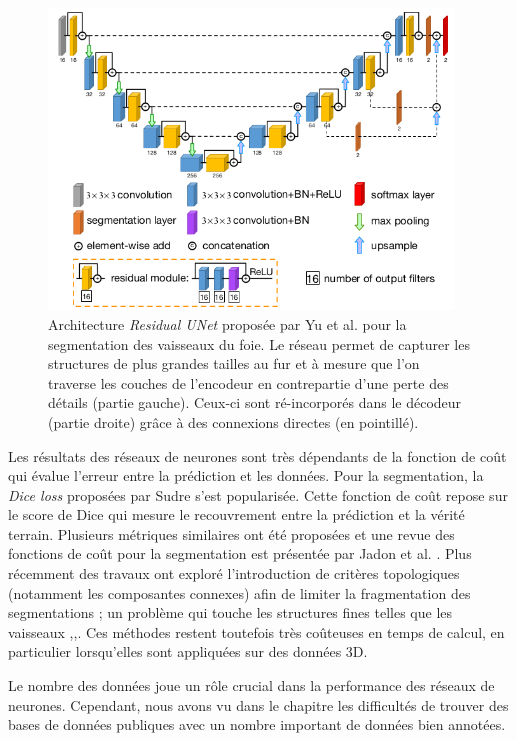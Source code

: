       \begin{figure}[!ht]
        \centering
        \includegraphics[height=8cm]{Images/Residual_Unet_Yu.png}
        \caption{Architecture \textit{Residual UNet} proposée par Yu et al. \cite{yu2019_liver_ResUnet} pour la segmentation des vaisseaux du foie. Le réseau permet de capturer les structures de plus grandes tailles au fur et à mesure que l'on traverse les couches de l'encodeur en contrepartie d'une perte des détails (partie gauche). Ceux-ci sont ré-incorporés dans le décodeur (partie droite) grâce à des connexions directes (en pointillé). }
        \label{fig:yu_resunet}
      \end{figure}
      
      Les résultats des réseaux de neurones sont très dépendants de la fonction de coût qui évalue l'erreur entre la prédiction et les données. Pour la segmentation, la \textit{Dice loss} proposées par Sudre \cite{Sudre2017_DiceLoss} s'est popularisée. Cette fonction de coût repose sur le score de Dice qui mesure le recouvrement entre la prédiction et la vérité terrain. Plusieurs métriques similaires ont été proposées et une revue des fonctions de coût pour la segmentation est présentée par Jadon et al. \cite{Jadon2020_survey_seg_loss}. Plus récemment des travaux ont exploré l'introduction de critères topologiques (notamment les composantes connexes) afin de limiter la fragmentation des segmentations ; un problème qui touche les structures fines telles que les vaisseaux \cite{Ventura2017iterative_topo},\cite{Hu2019_topo_homo_persi},\cite{Clough2019_topo_homo_persi}. Ces méthodes restent toutefois très coûteuses en temps de calcul, en particulier lorsqu'elles sont appliquées sur des données 3D. 

      Le nombre des données joue un rôle crucial dans la performance des réseaux de neurones. Cependant, nous avons vu dans le chapitre \chapContextN{} les difficultés de trouver des bases de données publiques avec un nombre important de données bien annotées. 

